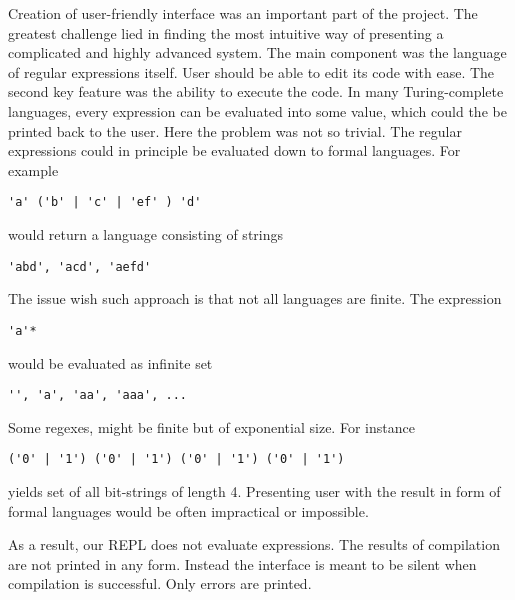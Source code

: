 
Creation of user-friendly interface was an important part of the project.
The greatest challenge lied in finding the most intuitive way of presenting a complicated and highly advanced system. The main component was the language of regular expressions itself. User should be able to edit its code with ease. The second key feature was the ability to execute the code. 
In many Turing-complete languages, every expression can be evaluated into some value, which could the be printed back to the user. Here the problem was not so trivial. The regular expressions could in principle be evaluated down to formal languages. For example 
\begin{lstlisting}
'a' ('b' | 'c' | 'ef' ) 'd'
\end{lstlisting}
would return a language consisting of strings
\begin{lstlisting}
'abd', 'acd', 'aefd'
\end{lstlisting}
The issue wish such approach is that not all languages are finite. The expression
\begin{lstlisting}
'a'*
\end{lstlisting}
would be evaluated as infinite set
\begin{lstlisting}
'', 'a', 'aa', 'aaa', ...
\end{lstlisting}
Some regexes, might be finite but of exponential size. For instance
\begin{lstlisting}
('0' | '1') ('0' | '1') ('0' | '1') ('0' | '1')
\end{lstlisting}
yields set of all bit-strings of length 4. Presenting user with the result in form of formal languages would be often impractical or impossible. 

As a result, our REPL does not evaluate expressions. The results of compilation are not printed in any form. Instead the interface is meant to be silent when compilation is successful. Only errors are printed. 

